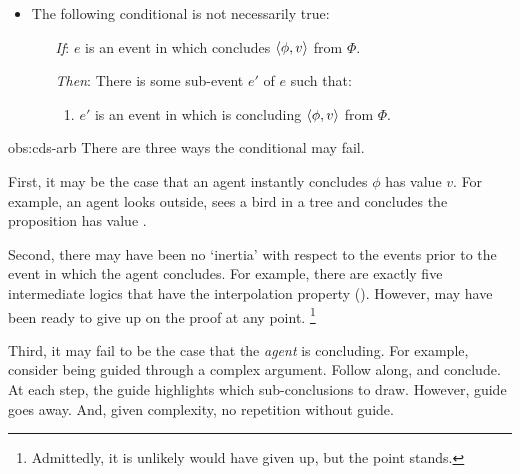 \begin{note}
\begin{observation}
    \begin{itemize}
    \item
      The following conditional is not necessarily true:
      \begin{itemize}
      \item[\emph{If}:]
        \(e\) is an event in which \vAgent{} concludes \(\langle \phi, v \rangle\) from \(\Phi\).
      \item[\emph{Then}:]
        There is some sub-event \(e'\) of \(e\) such that:
        \begin{enumerate}
        \item
          \(e'\) is an event in which \vAgent{} is concluding \(\langle \phi, v \rangle\) from \(\Phi\).
        \end{enumerate}
      \end{itemize}
    \end{itemize}
  \end{observation}

  \begin{argument}{obs:cds-arb}
    There are three ways the conditional may fail.

    First, it may be the case that an agent instantly concludes \(\phi\) has value \(v\).
    For example, an agent looks outside, sees a bird in a tree and concludes the proposition  has value .

    Second, there may have been no `inertia' with respect to the events prior to the event in which the agent concludes.
    For example, there are exactly five intermediate logics that have the interpolation property (\cite[cf.][]{Maksimova:1977un}).
    However, \citeauthor{Maksimova:1977un} may have been ready to give up on the proof at any point.%
    \footnote{%
      Admittedly, it is unlikely \citeauthor{Maksimova:1977un} would have given up, but the point stands.
    }

    Third, it may fail to be the case that the \emph{agent} is concluding.
    For example, consider being guided through a complex argument.
    Follow along, and conclude.
    At each step, the guide highlights which sub-conclusions to draw.
    However, guide goes away.
    And, given complexity, no repetition without guide.
  \end{argument}
\end{note}

